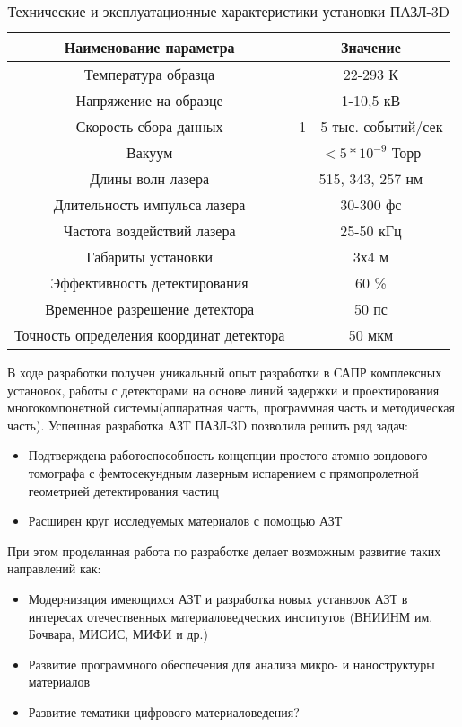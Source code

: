 \begin{table} [htbp]
	\centering
	\caption{Технические и эксплуатационные характеристики установки ПАЗЛ-3D}
	\label{tab:APPLEcharac}
	\begin{SingleSpace}
		\begin{tabular} {| c | c |}
			\hline
			Наименование параметра & Значение  \\ \hline
			Температура образца & 22-293 К                \\ \hline
			Напряжение на образце & 1-10,5 кВ               \\ \hline
			Скорость сбора данных & 1 - 5 тыс. событий/сек                \\ \hline
			Вакуум & $<5*10^{-9}$ Торр                \\ \hline
			Длины волн лазера & 515, 343, 257 нм               \\ \hline
			Длительность импульса лазера & 30-300 фс               \\ \hline
			Частота воздействий лазера & 25-50 кГц                \\ \hline
			Габариты установки & 3х4 м               \\ \hline
			Эффективность детектирования & 60 \%              \\ \hline
			Временное разрешение детектора & 50 пс               \\ \hline
			Точность определения координат детектора  & 50 мкм               \\ \hline
		\end{tabular}
	\end{SingleSpace}
\end{table}
В ходе разработки получен уникальный опыт разработки в САПР комплексных установок,  работы с детекторами на основе линий задержки и проектирования многокомпонетной системы(аппаратная часть, программная часть и методическая часть). Успешная разработка АЗТ ПАЗЛ-3D позволила решить ряд задач:

\begin{itemize}
	\item Подтверждена работоспособность концепции простого атомно-зондового томографа с фемтосекундным лазерным испарением с прямопролетной геометрией детектирования частиц
	\item Расширен круг исследуемых материалов с помощью АЗТ
\end{itemize}

При этом проделанная работа по разработке делает возможным развитие таких направлений как:
\begin{itemize}
	\item Модернизация имеющихся АЗТ и разработка новых устанвоок АЗТ в интересах отечественных материаловедческих институтов (ВНИИНМ им. Бочвара, МИСИС, МИФИ  и др.)
	\item Развитие программного обеспечения для анализа микро- и наноструктуры материалов
	\item Развитие тематики цифрового материаловедения?
\end{itemize}

\FloatBarrier







